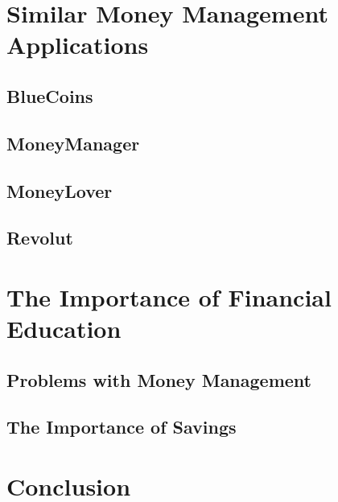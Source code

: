 \documentclass[12pt,a4paper]{book}
\theoremstyle{definition}
\theoremstyle{remark}
\begin{document}
\chapter{Similar Money Management Applications}
    \section{BlueCoins}
    \section{MoneyManager}
    \section{MoneyLover}
    \section{Revolut}

\chapter{The Importance of Financial Education}
    \section{Problems with Money Management}
    \section{The Importance of Savings}

\chapter{Conclusion}
\end{document}
